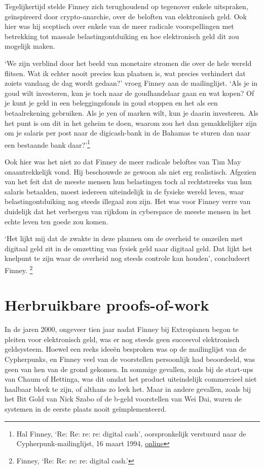 \documentclass[smalldemyvopaper,11pt,twoside,onecolumn,openright,extrafontsizes,hidelinks]{memoir}
\begin{document}
Tegelijkertijd stelde Finney zich terughoudend op tegenover enkele
uitspraken, geïnspireerd door crypto-anarchie, over de beloften van
elektronisch geld. Ook hier was hij sceptisch over enkele van de meer
radicale voorspellingen met betrekking tot massale belastingontduiking
en hoe elektronisch geld dit zou mogelijk maken.

`We zijn verblind door het beeld van monetaire stromen die over de hele
wereld flitsen. Wat ik echter nooit precies kan plaatsen is, wat precies
verhindert dat zoiets vandaag de dag wordt gedaan?' vroeg Finney aan de
mailinglijst. `Als je in goud wilt investeren, kun je toch naar de
goudhandelaar gaan en wat kopen? Of je kunt je geld in een
beleggingsfonds in goud stoppen en het als een betaalrekening gebruiken.
Als je yen of marken wilt, kun je daarin investeren. Als het punt is om
dit in het geheim te doen, waarom zou het dan gemakkelijker zijn om je
salaris per post naar de digicash-bank in de Bahamas te sturen dan naar
een bestaande bank daar?'\footnote{Hal Finney, `Re: Re: re: re: digital
  cash', oorspronkelijk verstuurd naar de Cypherpunk-mailinglijst, 16
  maart 1994,
  \href{https://cypherpunks.venona.com/date/1994/03/msg00694.html}{online}}

Ook hier was het niet zo dat Finney de meer radicale beloftes van Tim
May onaantrekkelijk vond. Hij beschouwde ze gewoon als niet erg
realistisch. Afgezien van het feit dat de meeste mensen hun belastingen
toch al rechtstreeks van hun salaris betaalden, moest iedereen
uiteindelijk in de fysieke wereld leven, waar belastingontduiking nog
steeds illegaal zou zijn. Het was voor Finney verre van duidelijk dat
het verbergen van rijkdom in cyberspace de meeste mensen in het echte
leven ten goede zou komen.

`Het lijkt mij dat de zwakte in deze plannen om de overheid te omzeilen
met digitaal geld zit in de omzetting van fysiek geld naar digitaal
geld. Dat lijkt het knelpunt te zijn waar de overheid nog steeds
controle kan houden', concludeert Finney. \footnote{Finney, `Re: Re: re:
  re: digital cash.'}

\section{Herbruikbare proofs-of-work}\label{herbruikbare-proofs-of-work}

In de jaren 2000, ongeveer tien jaar nadat Finney bij Extropianen begon
te pleiten voor elektronisch geld, was er nog steeds geen succesvol
elektronisch geldsysteem. Hoewel een reeks ideeën besproken was op de
mailinglijst van de Cypherpunks, en Finney veel van de voorstellen
persoonlijk had beoordeeld, was geen van hen van de grond gekomen. In
sommige gevallen, zoals bij de start-ups van Chaum of Hettinga, was dit
omdat het product uiteindelijk commercieel niet haalbaar bleek te zijn,
of althans zo leek het. Maar in andere gevallen, zoals bij het Bit Gold
van Nick Szabo of de b-geld voorstellen van Wei Dai, waren de systemen
in de eerste plaats nooit geïmplementeerd.
\end{document}
